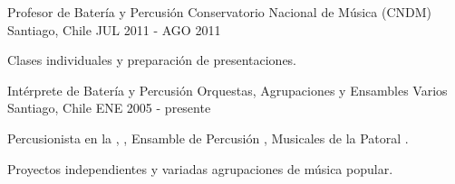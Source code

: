 \begin{cventries}
  \cventry
    {Profesor de Batería y Percusión}
    {Conservatorio Nacional de Música (CNDM)}
    {Santiago, Chile}
    {JUL 2011 - AGO 2011}
    {
      \begin{cvitems} %
        \item {Clases individuales y preparación de presentaciones.}
      \end{cvitems}
    }

  \cventry
    {Intérprete de Batería y Percusión}
    {Orquestas, Agrupaciones y Ensambles Varios}
    {Santiago, Chile}
    {ENE 2005 - presente}
    {
    	\begin{cvitems} %
        \item {Percusionista en la , , Ensamble de Percusión , Musicales de la Patoral .}
        \item {Proyectos independientes y variadas agrupaciones de música popular.}
      \end{cvitems}
		}

% 
\end{cventries}
